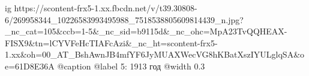  
 
 
 
 

\ifcmt
  ig https://scontent-frx5-1.xx.fbcdn.net/v/t39.30808-6/269958344_10226583993495988_7518538805609814439_n.jpg?_nc_cat=105&ccb=1-5&_nc_sid=b9115d&_nc_ohc=MpA23TvQQHEAX-FISX9&tn=lCYVFeHcTIAFcAzi&_nc_ht=scontent-frx5-1.xx&oh=00_AT_BshAwnJB4mfYF6JyMUAXWecVG8hKBatXszIYULglqSA&oe=61D8E36A
	@caption @label 5: 1913 год
  @width 0.3
\fi
